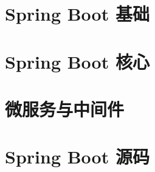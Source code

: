 \documentclass{C:/Users/Violet/OneDrive/Notiz/ComputerScience/99-索引与模板/TexTemplate/computer-notes}
\begin{document}
\makecover
\tableofcontents
\newpage





\part{Spring Boot 基础}




\part{Spring Boot 核心}







\part{微服务与中间件}


\part{Spring Boot 源码}
\end{document}
